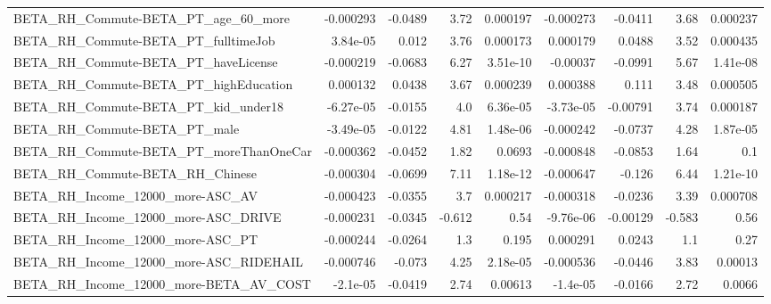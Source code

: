 \begin{tabular}{lrrrrrrrr}
BETA\_RH\_Commute-BETA\_PT\_age\_60\_more                &   -0.000293 &      -0.0489 &      3.72 & 0.000197 &  -0.000273 &     -0.0411 &         3.68 &      0.000237 \\
BETA\_RH\_Commute-BETA\_PT\_fulltimeJob                &    3.84e-05 &        0.012 &      3.76 & 0.000173 &   0.000179 &      0.0488 &         3.52 &      0.000435 \\
BETA\_RH\_Commute-BETA\_PT\_haveLicense                &   -0.000219 &      -0.0683 &      6.27 & 3.51e-10 &   -0.00037 &     -0.0991 &         5.67 &      1.41e-08 \\
BETA\_RH\_Commute-BETA\_PT\_highEducation              &    0.000132 &       0.0438 &      3.67 & 0.000239 &   0.000388 &       0.111 &         3.48 &      0.000505 \\
BETA\_RH\_Commute-BETA\_PT\_kid\_under18                &   -6.27e-05 &      -0.0155 &       4.0 & 6.36e-05 &  -3.73e-05 &    -0.00791 &         3.74 &      0.000187 \\
BETA\_RH\_Commute-BETA\_PT\_male                       &   -3.49e-05 &      -0.0122 &      4.81 & 1.48e-06 &  -0.000242 &     -0.0737 &         4.28 &      1.87e-05 \\
BETA\_RH\_Commute-BETA\_PT\_moreThanOneCar             &   -0.000362 &      -0.0452 &      1.82 &   0.0693 &  -0.000848 &     -0.0853 &         1.64 &           0.1 \\
BETA\_RH\_Commute-BETA\_RH\_Chinese                    &   -0.000304 &      -0.0699 &      7.11 & 1.18e-12 &  -0.000647 &      -0.126 &         6.44 &      1.21e-10 \\
BETA\_RH\_Income\_12000\_more-ASC\_AV                   &   -0.000423 &      -0.0355 &       3.7 & 0.000217 &  -0.000318 &     -0.0236 &         3.39 &      0.000708 \\
BETA\_RH\_Income\_12000\_more-ASC\_DRIVE                &   -0.000231 &      -0.0345 &    -0.612 &     0.54 &  -9.76e-06 &    -0.00129 &       -0.583 &          0.56 \\
BETA\_RH\_Income\_12000\_more-ASC\_PT                   &   -0.000244 &      -0.0264 &       1.3 &    0.195 &   0.000291 &      0.0243 &          1.1 &          0.27 \\
BETA\_RH\_Income\_12000\_more-ASC\_RIDEHAIL             &   -0.000746 &       -0.073 &      4.25 & 2.18e-05 &  -0.000536 &     -0.0446 &         3.83 &       0.00013 \\
BETA\_RH\_Income\_12000\_more-BETA\_AV\_COST             &    -2.1e-05 &      -0.0419 &      2.74 &  0.00613 &   -1.4e-05 &     -0.0166 &         2.72 &        0.0066 \\

\end{tabular}
